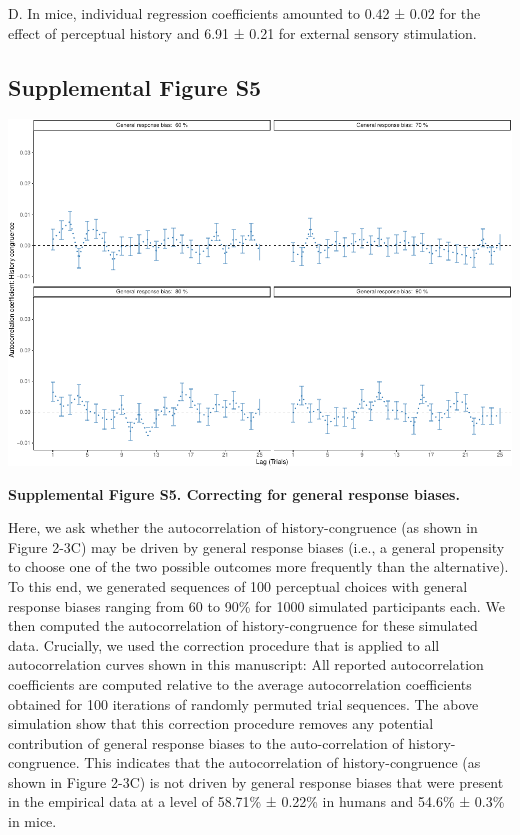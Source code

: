 \documentclass[
]{article}
\begin{document}
D. In mice, individual regression coefficients amounted to 0.42 ± 0.02
for the effect of perceptual history and 6.91 ± 0.21 for external
sensory stimulation.

\newpage

\hypertarget{supplemental-figure-s5}{%
\subsection{Supplemental Figure S5}\label{supplemental-figure-s5}}

\includegraphics{modes_mouse_files/figure-latex/Supplemental_Figure_S5-1.pdf}

\textbf{Supplemental Figure S5. Correcting for general response biases.}

Here, we ask whether the autocorrelation of history-congruence (as shown
in Figure 2-3C) may be driven by general response biases (i.e., a
general propensity to choose one of the two possible outcomes more
frequently than the alternative). To this end, we generated sequences of
100 perceptual choices with general response biases ranging from 60 to
90\% for 1000 simulated participants each. We then computed the
autocorrelation of history-congruence for these simulated data.
Crucially, we used the correction procedure that is applied to all
autocorrelation curves shown in this manuscript: All reported
autocorrelation coefficients are computed relative to the average
autocorrelation coefficients obtained for 100 iterations of randomly
permuted trial sequences. The above simulation show that this correction
procedure removes any potential contribution of general response biases
to the auto-correlation of history-congruence. This indicates that the
autocorrelation of history-congruence (as shown in Figure 2-3C) is not
driven by general response biases that were present in the empirical
data at a level of 58.71\% ± 0.22\% in humans and 54.6\% ± 0.3\% in
mice.
\end{document}
